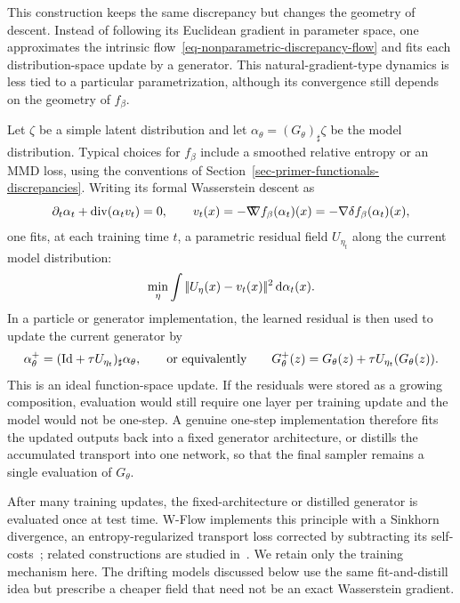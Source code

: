 This construction keeps the same discrepancy but changes the geometry of descent. Instead of following its Euclidean gradient in parameter space, one approximates the intrinsic flow~\eqref{eq-nonparametric-discrepancy-flow} and fits each distribution-space update by a generator. This natural-gradient-type dynamics is less tied to a particular parametrization, although its convergence still depends on the geometry of $f_\beta$.

Let $\zeta$ be a simple latent distribution and let $\alpha_\theta=(G_\theta)_\sharp\zeta$ be the model distribution. Typical choices for $f_\beta$ include a smoothed relative entropy or an MMD loss, using the conventions of Section~\ref{sec-primer-functionals-discrepancies}. Writing its formal Wasserstein descent as
\begin{equation}\label{eq-one-step-wgf}
	\partial_t\alpha_t+\operatorname{div}(\alpha_t v_t)=0,
	\qquad
	v_t(x)=-\mathord{\nabla\mkern-9.3mu\nabla} f_\beta(\alpha_t)(x)
	=-\nabla\delta f_\beta(\alpha_t)(x),
\end{equation}
one fits, at each training time $t$, a parametric residual field $U_{\eta_t}$ along the current model distribution:
\begin{equation}\label{eq-one-step-l2-fit}
	\min_\eta \int
		|\!| U_\eta(x)-v_t(x) |\!|^2
		\,\mathrm{d}\alpha_t(x).
\end{equation}
In a particle or generator implementation, the learned residual is then used to update the current generator by
\[
	\alpha_{\theta}^{+}
	=
	(\mathrm{Id}+\tau U_{\eta_t})_\sharp \alpha_\theta,
	\qquad\text{or equivalently}\qquad
	G_\theta^{+}(z)=G_\theta(z)+\tau U_{\eta_t}(G_\theta(z)).
\]
This is an ideal function-space update. If the residuals were stored as a growing composition, evaluation would still require one layer per training update and the model would not be one-step. A genuine one-step implementation therefore fits the updated outputs back into a fixed generator architecture, or distills the accumulated transport into one network, so that the final sampler remains a single evaluation of $G_\theta$.


After many training updates, the fixed-architecture or distilled generator is evaluated once at test time. W-Flow implements this principle with a Sinkhorn divergence, an entropy-regularized transport loss corrected by subtracting its self-costs~\citep{Han2026WFlow}; related constructions are studied in~\citet{He2026SinkhornDrifting}. We retain only the training mechanism here. The drifting models discussed below use the same fit-and-distill idea but prescribe a cheaper field that need not be an exact Wasserstein gradient.

